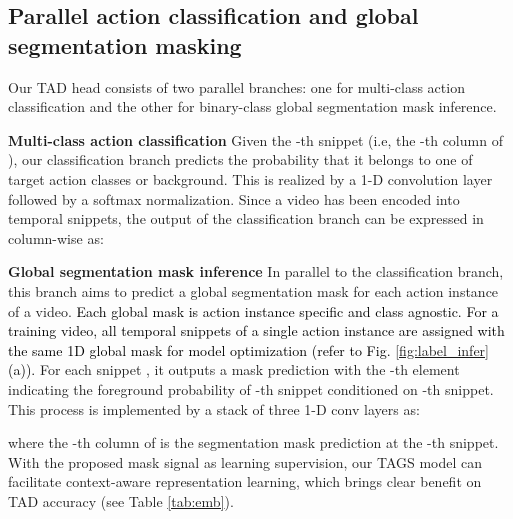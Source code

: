 \documentclass[runningheads]{llncs}
\newcommand{\shortmodelname}{TAGS}
\begin{document}
\subsection{Parallel action classification and global segmentation masking}
\label{sec:model_head}
Our TAD head consists of two parallel branches:
one for multi-class action classification 
and 
the other for binary-class global segmentation mask inference. 

 
\noindent\textbf{Multi-class action classification}
Given the -th snippet  (i.e, the -th column of ),
our classification branch predicts the probability  that
it belongs to one of  target action classes or background.
This is realized by a 1-D convolution layer  followed by 
a softmax normalization.
Since a video has been encoded into  temporal snippets, the output of the classification branch can be expressed in column-wise as:



\noindent\textbf{Global segmentation mask inference} 
In parallel to the classification branch,
this branch aims to predict a global segmentation mask for each action instance of a video.
\textcolor{black}{
Each global mask is action instance specific and class agnostic.
For a training video, all temporal snippets of a single action instance are assigned with the same 1D global mask  for model optimization \textcolor{black} {(refer to Fig. \ref{fig:label_infer}(a)).}
}
For each snippet , 
it outputs a mask prediction 
with the -th element  indicating the foreground probability of -th snippet conditioned on 
-th snippet.
This process is implemented by a stack of three 1-D conv layers as:

where the -th column of  is the segmentation mask prediction at the -th snippet.
With the proposed mask signal as learning supervision,
our {\shortmodelname} model can facilitate context-aware representation learning, which brings clear benefit on TAD accuracy (see Table \ref{tab:emb}).
\end{document}
